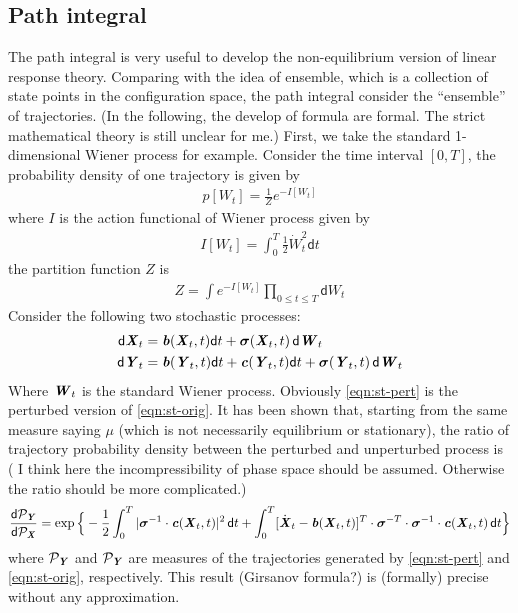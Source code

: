 \documentclass[aip,jcp,a4paper,reprint,onecolumn]{revtex4-1}
\newcommand{\recheck}[1]{{\color{red} #1}}
\newcommand{\vect}[1]{\textbf{\textit{#1}}}
\newcommand{\dd}{\textsf{d}}
\newcommand{\bsigma}{\boldsymbol\sigma}
\begin{document}
\subsection{Path integral}
The path integral is very useful to develop the non-equilibrium version of
linear response theory. 
Comparing with the idea of ensemble, which is a collection of state points
in the configuration space, the path integral consider the ``ensemble'' of
trajectories.
(In the following, the develop of formula are formal. The strict mathematical
theory is still unclear for me.)
First, we take the standard 1-dimensional Wiener process for example.
Consider the time interval $[0,T]$, the probability density of one trajectory
is given by
\begin{align}
  p[W_t] = \frac 1Z e^{-I[W_t]}
\end{align}
where $I$ is the action functional of Wiener process given by
\begin{align}
  I[W_t] = \int_0^T\frac12 \dot{W}_t^2\dd t
\end{align}
the partition function $Z$ is
\begin{align}
  Z = \int  e^{-I[W_t]} \prod_{0\leq t\leq T}\dd W_t
\end{align}
Consider the following two stochastic processes:
\begin{align}\label{eqn:st-orig}
  \dd \vect X_t &= \vect b(\vect X_t, t) \dd t + \bsigma(\vect X_t, t)\,\dd\vect W_t \\\label{eqn:st-pert}
  \dd \vect Y_t &= \vect b(\vect Y_t, t) \dd t + \vect c(\vect Y_t, t) \dd t + \bsigma(\vect Y_t, t)\,\dd\vect W_t
\end{align}
Where $\vect W_t$ is the standard Wiener process. Obviously
\eqref{eqn:st-pert} is the perturbed version of
\eqref{eqn:st-orig}. It has been shown that, starting from the same
measure saying $\mu$ (which is not necessarily equilibrium or
stationary), the ratio of trajectory probability density between the perturbed
and unperturbed process is~\cite{li2010lecture} (\recheck{I think here
  the incompressibility of phase space should be assumed. Otherwise the
  ratio should be more complicated.})
\begin{align}\label{eqn:girsanov}
  \frac{\dd\mathcal P_{\vect Y}}{\dd\mathcal P_{\vect X}}
  =
  \exp
  \Big\{
  -\frac12 \int_0^T\vert\bsigma^{-1}\cdot\vect c(\vect X_t,t)\vert^2\,\dd t
  +\int_0^T[\dot{\vect X}_t - \vect b(\vect X_t,t)]^T
  \cdot\bsigma^{-T}\cdot\bsigma^{-1}\cdot\vect c(\vect X_t,t)\,\dd t 
  \Big\}
\end{align}
where $\mathcal P_{\vect Y}$ and $\mathcal P_{\vect Y}$ are measures
of the trajectories generated by \eqref{eqn:st-pert} and
\eqref{eqn:st-orig}, respectively.  This result (Girsanov formula?) is
(formally) precise without any approximation.
\end{document}
